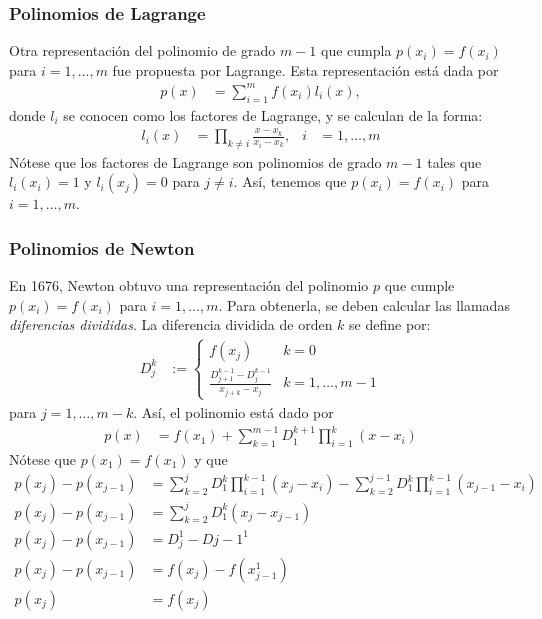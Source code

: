 \subsubsection{Polinomios de Lagrange}
Otra representación del polinomio de grado $m-1$ que cumpla $p(x_i)=f(x_i)$ para $i=1,\ldots,m$ fue propuesta por Lagrange. Esta representación está dada por
\begin{align*}
p(x)&=\sum\limits_{i=1}^{m}f(x_i)l_i(x),
\end{align*}
donde $l_i$ se conocen como los factores de Lagrange, y se calculan de la forma\cite{Kress2012}:
\begin{align*}
l_i(x)&=\prod\limits_{k\not =i}\frac{x-x_k}{x_i-x_k}, & i&=1,\ldots, m
\end{align*}
Nótese que los factores de Lagrange son polinomios de grado $m-1$ tales que $l_i(x_i)=1$ y $l_i(x_j)=0$ para $j\not =i$. Así, tenemos que $p(x_i)=f(x_i)$ para $i=1,\ldots,m$.
\subsubsection{Polinomios de Newton}
En 1676, Newton obtuvo una representación del polinomio $p$ que cumple $p(x_i)=f(x_i)$ para $i=1,\ldots,m$. Para obtenerla, se deben calcular las llamadas \textit{diferencias divididas}. La diferencia dividida de orden $k$ se define por:
\begin{align*}
D_j^k&:=\begin{cases} f(x_j) & k=0\\
\frac{D_{j+1}^{k-1}-D_{j}^{k-1}}{x_{j+k}-x_j}& k=1,\ldots,m-1 \end{cases}
\end{align*}
para $j=1,\ldots,m-k$. Así, el polinomio está dado por\cite{Kress2012}
\begin{align*}
p(x)&=f(x_1) + \sum\limits_{k=1}^{m-1} D_{1}^{k+1} \prod\limits_{i=1}^{k}(x-x_i)
\end{align*}
Nótese que $p(x_1)=f(x_1)$ y que
\begin{align*}
p(x_{j})-p(x_{j-1})&=\sum\limits_{k=2}^j D_{1}^k \prod\limits_{i=1}^{k-1}(x_j-x_i) - \sum\limits_{k=2}^{j-1} D_{1}^k \prod\limits_{i=1}^{k-1}(x_{j-1}-x_i)\\
p(x_{j})-p(x_{j-1})&=\sum\limits_{k=2}^j D_{1}^k (x_j-x_{j-1})\\
p(x_{j})-p(x_{j-1})&=D_{j}^1 -D{j-1}^1\\
p(x_{j})-p(x_{j-1})&=f(x_j) - f(x_{j-1}^1)\\
p(x_{j})&=f(x_j)
\end{align*}
